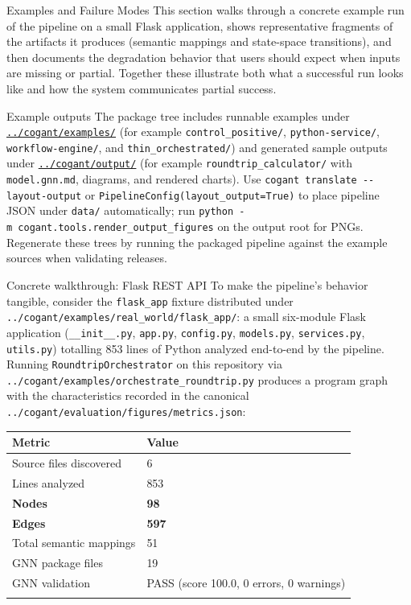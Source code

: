\documentclass[
  ignorenonframetext,
]{beamer}
\author{\texorpdfstring{}{}}
\date{}
\newcounter{none} %
\begin{document}
\begin{frame}[fragile]{Examples and Failure Modes}
\protect{}\label{examples-and-failure-modes}
This section walks through a concrete example run of the pipeline on a
small Flask application, shows representative fragments of the artifacts
it produces (semantic mappings and state-space transitions), and then
documents the degradation behavior that users should expect when inputs
are missing or partial. Together these illustrate both what a successful
run looks like and how the system communicates partial success.

\begin{block}{Example outputs}
\protect{}\label{example-outputs}
The package tree includes runnable examples under
\href{../cogant/examples/}{\texttt{../cogant/examples/}} (for example
\texttt{control\_positive/}, \texttt{python-service/},
\texttt{workflow-engine/}, and \texttt{thin\_orchestrated/}) and
generated sample outputs under
\href{../cogant/output/}{\texttt{../cogant/output/}} (for example
\texttt{roundtrip\_calculator/} with \texttt{model.gnn.md}, diagrams,
and rendered charts). Use \texttt{cogant\ translate\ -\/-layout-output}
or \texttt{PipelineConfig(layout\_output=True)} to place pipeline JSON
under \texttt{data/} automatically; run
\texttt{python\ -m\ cogant.tools.render\_output\_figures} on the output
root for PNGs. Regenerate these trees by running the packaged pipeline
against the example sources when validating releases.

\begin{block}{Concrete walkthrough: Flask REST API}
\protect{}\label{concrete-walkthrough-flask-rest-api}
To make the pipeline's behavior tangible, consider the
\texttt{flask\_app} fixture distributed under
\texttt{../cogant/examples/real\_world/flask\_app/}: a small six-module
Flask application (\texttt{\_\_init\_\_.py}, \texttt{app.py},
\texttt{config.py}, \texttt{models.py}, \texttt{services.py},
\texttt{utils.py}) totalling 853 lines of Python analyzed end-to-end by
the pipeline. Running \texttt{RoundtripOrchestrator} on this repository
via \texttt{../cogant/examples/orchestrate\_roundtrip.py} produces a
program graph with the characteristics recorded in the canonical
\texttt{../cogant/evaluation/figures/metrics.json}:

{\def\LTcaptype{none} %
\begin{longtable}[]{@{}ll@{}}
\toprule\noalign{}
Metric & Value \\
\midrule\noalign{}
\endhead
Source files discovered & 6 \\
Lines analyzed & 853 \\
\textbf{Nodes} & \textbf{98} \\
\textbf{Edges} & \textbf{597} \\
Total semantic mappings & 51 \\
GNN package files & 19 \\
GNN validation & PASS (score 100.0, 0 errors, 0 warnings) \\
\bottomrule\noalign{}
\end{longtable}
}


\end{block}
\end{block}
\end{frame}
\end{document}
